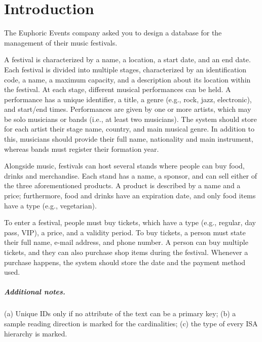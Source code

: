 \chapter{Introduction}

The Euphoric Events company asked you to design a database for the management of their music festivals.

A festival is characterized by a name, a location, a start date, and an end date. Each festival is divided into multiple stages, characterized by an identification code, a name, a maximum capacity, and a description about its location within the festival. At each stage, different musical performances can be held. A performance has a unique identifier, a title, a genre (e.g., rock, jazz, electronic), and start/end times. Performances are given by one or more artists, which may be solo musicians or bands (i.e., at least two musicians). The system should store for each artist their stage name, country, and main musical genre. In addition to this, musicians should provide their full name, nationality and main instrument, whereas bands must register their formation year.

Alongside music, festivals can host several stands where people can buy food, drinks and merchandise. Each stand has a name, a sponsor, and can sell either of the three aforementioned products. A product is described by a name and a price; furthermore, food and drinks have an expiration date, and only food items have a type (e.g., vegetarian).

To enter a festival, people must buy tickets, which have a type (e.g., regular, day pass, VIP), a price, and a validity period. To buy tickets, a person must state their full name, e-mail address, and phone number. A person can buy multiple tickets, and they can also purchase shop items during the festival. Whenever a purchase happens, the system should store the date and the payment method used.

\paragraph{Additional notes.} (a) Unique IDs only if no attribute of the text can be a primary key; (b) a sample reading direction is marked for the cardinalities; (c) the type of every ISA hierarchy is marked.
